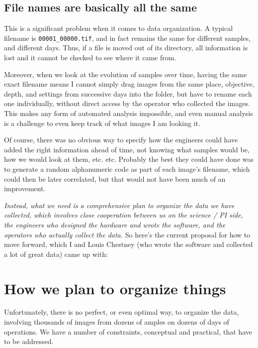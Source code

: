 \subsection{File names are basically all the same}\hypertarget{file-names-are-basically-all-the-same}{}\label{file-names-are-basically-all-the-same}
This is a significant problem when it comes to data organization. A typical
filename is {\tt 00001\_00000.tif}, and in fact remains the same for different
samples, and different days. Thus, if a file is moved out of its directory, all
information is lost and it cannot be checked to see where it came from.

Moreover, when we look at the evolution of samples over time, having the same
exact filename means I cannot simply drag images from the same place, objective,
depth, and settings from successive days into the folder, but have to rename
each one individually, without direct access by the operator who collected the
images. This makes any form of automated analysis impossible, and even manual
analysis is a challenge to even keep track of what images I am looking it.

Of course, there was no obvious way to specify how the engineers could have
added the right information ahead of time, not knowing what samples would be,
how we would look at them, etc. etc. Probably the best they could have done was
to generate a random alphanumeric code as part of each image's filename, which
could then be later correlated, but that would not have been much of an
improvement.

\emph{Instead, what we need is a comprehensive plan to organize the data we have
collected, which involves close cooperation between us on the science / PI side,
the engineers who designed the hardware and wrote the software, and the
operators who actually collect the data.} So here's the current proposal for how
to move forward, which I and Louis Chestney (who wrote the software and
collected a lot of great data) came up with:

\section{How we plan to organize things}\hypertarget{how-we-plan-to-organize-things}{}\label{how-we-plan-to-organize-things}
Unfortunately, there is no perfect, or even optimal way, to organize the data,
involving thousands of images from dozens of amples on dozens of days of
operations. We have a number of constraints, conceptual and practical, that have
to be addressed.

